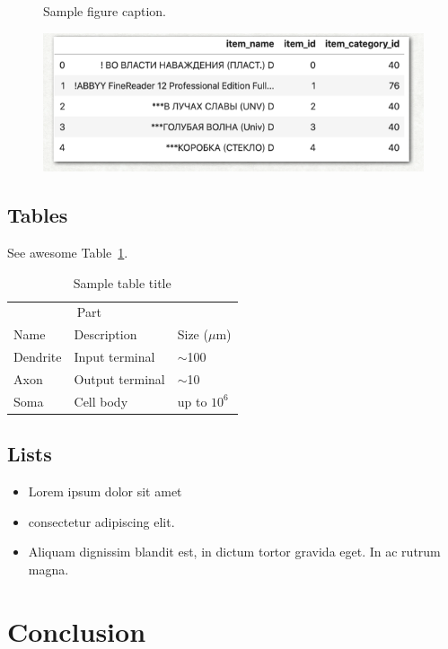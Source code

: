 \documentclass{article}
\begin{document}
\begin{figure}
  \centering
  \fbox{\rule[-.5cm]{4cm}{4cm} \rule[-.5cm]{4cm}{0cm}}
  \caption{Sample figure caption.}
  \label{fig:fig1}
\end{figure}

\begin{figure} %
    \centering
    \includegraphics{image/test.png}
\end{figure}

\subsection{Tables}
\lipsum[12]
See awesome Table~\ref{tab:table}.

\begin{table}
 \caption{Sample table title}
  \centering
  \begin{tabular}{lll}
    \toprule
    \multicolumn{2}{c}{Part}                   \\
    \cmidrule(r){1-2}
    Name     & Description     & Size ($\mu$m) \\
    \midrule
    Dendrite & Input terminal  & $\sim$100     \\
    Axon     & Output terminal & $\sim$10      \\
    Soma     & Cell body       & up to $10^6$  \\
    \bottomrule
  \end{tabular}
  \label{tab:table}
\end{table}

\subsection{Lists}
\begin{itemize}
\item Lorem ipsum dolor sit amet
\item consectetur adipiscing elit. 
\item Aliquam dignissim blandit est, in dictum tortor gravida eget. In ac rutrum magna.
\end{itemize}

\section{Conclusion}

  
\end{document}
